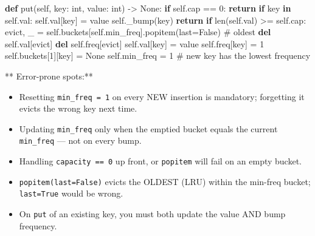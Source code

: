 \documentclass[11pt]{article}
\providecommand{\tightlist}{\setlength{\itemsep}{1pt}\setlength{\parskip}{0pt}}
\newenvironment{Shaded}{\begin{snugshade}}{\end{snugshade}}
\newcommand{\BuiltInTok}[1]{\textcolor[rgb]{0.50,0.55,0.55}{#1}}
\newcommand{\CommentTok}[1]{\textcolor[rgb]{0.48,0.49,0.49}{#1}}
\newcommand{\ControlFlowTok}[1]{\textcolor[rgb]{0.99,0.74,0.29}{\textbf{#1}}}
\newcommand{\DecValTok}[1]{\textcolor[rgb]{0.96,0.45,0.00}{#1}}
\newcommand{\KeywordTok}[1]{\textcolor[rgb]{0.81,0.81,0.76}{\textbf{#1}}}
\newcommand{\NormalTok}[1]{\textcolor[rgb]{0.81,0.81,0.76}{#1}}
\newcommand{\OperatorTok}[1]{\textcolor[rgb]{0.81,0.81,0.76}{#1}}
\newcommand{\VariableTok}[1]{\textcolor[rgb]{0.15,0.68,0.68}{#1}}
\begin{document}
\begin{Shaded}
\begin{Highlighting}[]
    \KeywordTok{def}\NormalTok{ put(}\VariableTok{self}\NormalTok{, key: }\BuiltInTok{int}\NormalTok{, value: }\BuiltInTok{int}\NormalTok{) }\OperatorTok{{-}\textgreater{}} \VariableTok{None}\NormalTok{:}
        \ControlFlowTok{if} \VariableTok{self}\NormalTok{.cap }\OperatorTok{==} \DecValTok{0}\NormalTok{:}
            \ControlFlowTok{return}
        \ControlFlowTok{if}\NormalTok{ key }\KeywordTok{in} \VariableTok{self}\NormalTok{.val:}
            \VariableTok{self}\NormalTok{.val[key] }\OperatorTok{=}\NormalTok{ value}
            \VariableTok{self}\NormalTok{.\_bump(key)}
            \ControlFlowTok{return}
        \ControlFlowTok{if} \BuiltInTok{len}\NormalTok{(}\VariableTok{self}\NormalTok{.val) }\OperatorTok{\textgreater{}=} \VariableTok{self}\NormalTok{.cap:}
\NormalTok{            evict, \_ }\OperatorTok{=} \VariableTok{self}\NormalTok{.buckets[}\VariableTok{self}\NormalTok{.min\_freq].popitem(last}\OperatorTok{=}\VariableTok{False}\NormalTok{)  }\CommentTok{\# oldest}
            \KeywordTok{del} \VariableTok{self}\NormalTok{.val[evict]}
            \KeywordTok{del} \VariableTok{self}\NormalTok{.freq[evict]}
        \VariableTok{self}\NormalTok{.val[key] }\OperatorTok{=}\NormalTok{ value}
        \VariableTok{self}\NormalTok{.freq[key] }\OperatorTok{=} \DecValTok{1}
        \VariableTok{self}\NormalTok{.buckets[}\DecValTok{1}\NormalTok{][key] }\OperatorTok{=} \VariableTok{None}
        \VariableTok{self}\NormalTok{.min\_freq }\OperatorTok{=} \DecValTok{1}                   \CommentTok{\# new key has the lowest frequency}
\end{Highlighting}
\end{Shaded}

** Error-prone spots:**

\begin{itemize}
\tightlist
\item
  Resetting \texttt{min\_freq\ =\ 1} on every NEW insertion is mandatory; forgetting it evicts the wrong key next time.
\item
  Updating \texttt{min\_freq} only when the emptied bucket equals the current \texttt{min\_freq} --- not on every bump.
\item
  Handling \texttt{capacity\ ==\ 0} up front, or \texttt{popitem} will fail on an empty bucket.
\item
  \texttt{popitem(last=False)} evicts the OLDEST (LRU) within the min-freq bucket; \texttt{last=True} would be wrong.
\item
  On \texttt{put} of an existing key, you must both update the value AND bump frequency.
\end{itemize}
\end{document}
